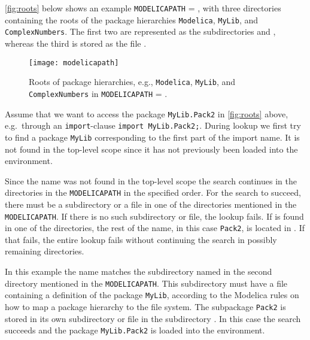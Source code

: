 \begin{example}
\autoref{fig:roots} below shows an example \lstinline!MODELICAPATH! = , with three
directories containing the roots of the package hierarchies \lstinline!Modelica!, \lstinline!MyLib!, and \lstinline!ComplexNumbers!.  The first two are represented as
the subdirectories  and , whereas the third is stored
as the file .

\begin{figure}[H]
\caption{%
Roots of package hierarchies, e.g., \lstinline!Modelica!, \lstinline!MyLib!, and \lstinline!ComplexNumbers! in
\lstinline!MODELICAPATH! = .
}
\label{fig:roots}
\texttt{[image: modelicapath]}
\end{figure}

Assume that we want to access the package \lstinline!MyLib.Pack2! in \autoref{fig:roots} above, e.g.\ through an \lstinline!import!-clause \lstinline!import MyLib.Pack2;!.
During lookup we first try to find a package \lstinline!MyLib! corresponding to the first part of the import name.  It is not found in the top-level scope since it has not
previously been loaded into the environment.

Since the name was not found in the top-level scope the search continues in the directories in the \lstinline!MODELICAPATH! in the specified order.  For the search to succeed,
there must be a subdirectory  or a file  in one of the directories mentioned in the \lstinline!MODELICAPATH!.  If there is no such
subdirectory or file, the lookup fails.  If  is found in one of the directories, the rest of the name, in this case \lstinline!Pack2!, is located in
.  If that fails, the entire lookup fails without continuing the search in possibly remaining directories.

In this example the name matches the subdirectory named  in the second directory  mentioned in the \lstinline!MODELICAPATH!.
This subdirectory must have a file  containing a definition of the package \lstinline!MyLib!, according to the Modelica rules on how to map a package
hierarchy to the file system.  The subpackage \lstinline!Pack2! is stored in its own subdirectory or file in the subdirectory .  In this case the search
succeeds and the package \lstinline!MyLib.Pack2! is loaded into the environment.
\end{example}
